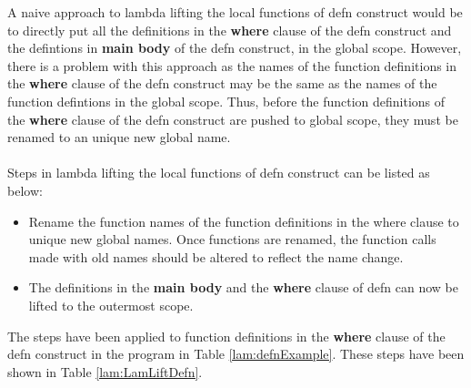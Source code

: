 \documentclass[11pt]{article}
\begin{document}
A naive approach to lambda lifting the local functions of {\sf defn} construct would be to directly put all the definitions in the {\bf where} clause of the {\sf defn} construct  and the defintions in {\bf main body} of the {\sf defn} construct, in the global scope. However, there is a problem with this approach as the names of the function definitions in the {\bf where} clause of the {\sf defn} construct may be the same as the names of the function defintions in the global scope. Thus, before the function definitions of the {\bf where} clause of the {\sf defn} construct are pushed to global scope, they must be renamed to an unique new global name.
~~\\~~\\ 
Steps in lambda lifting the local functions of {\sf defn} construct can be listed as below:
\begin{itemize}
  \item Rename the function names of the function definitions in the {\sf where} clause to unique new global names. Once functions are renamed, the function calls made with old names should be altered to reflect the name change.
  \item The definitions in the {\bf main body} and the {\bf where} clause of defn can now be lifted to the outermost scope.
\end{itemize}
The steps have been applied to function definitions in the {\bf where} clause of the {\sf defn} construct in the program in Table \ref {lam:defnExample}. These steps have been shown in Table \ref {lam:LamLiftDefn}.
\end{document}
